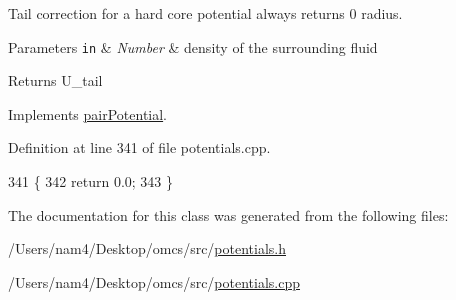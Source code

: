 Tail correction for a hard core potential always returns 0 radius. 


\begin{DoxyParams}[1]{Parameters}
\mbox{\tt in}  & {\em Number} & density of the surrounding fluid\\
\hline
\end{DoxyParams}
\begin{DoxyReturn}{Returns}
U\+\_\+tail 
\end{DoxyReturn}


Implements \hyperlink{classpair_potential_a5387d21d8d487d1d42e9eaf7cae9175b}{pair\+Potential}.



Definition at line 341 of file potentials.\+cpp.


\begin{DoxyCode}
341                                                     \{
342                 \textcolor{keywordflow}{return} 0.0;
343 \}
\end{DoxyCode}


The documentation for this class was generated from the following files\+:\begin{DoxyCompactItemize}
\item 
/\+Users/nam4/\+Desktop/omcs/src/\hyperlink{potentials_8h}{potentials.\+h}\item 
/\+Users/nam4/\+Desktop/omcs/src/\hyperlink{potentials_8cpp}{potentials.\+cpp}\end{DoxyCompactItemize}
